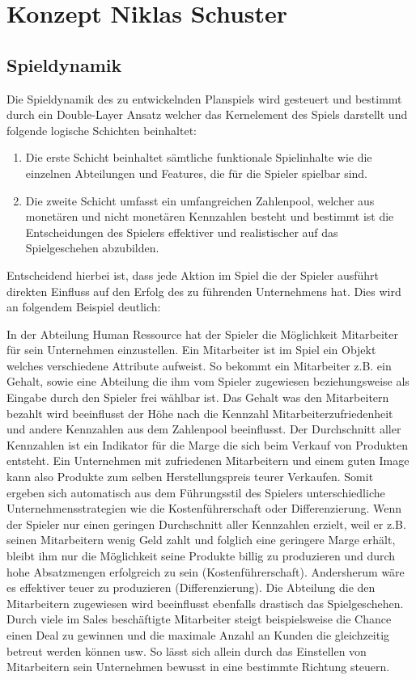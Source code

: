 \section{Konzept \textnormal{\textsf{\small{Niklas Schuster}}}}
\subsection{Spieldynamik}
Die Spieldynamik des zu entwickelnden Planspiels wird gesteuert und bestimmt durch ein Double-Layer Ansatz welcher das Kernelement des Spiels darstellt und folgende logische Schichten beinhaltet:
\begin{enumerate}
\item Die erste Schicht beinhaltet sämtliche funktionale Spielinhalte wie die einzelnen Abteilungen und Features, die für die Spieler spielbar sind.
\item Die zweite Schicht umfasst ein umfangreichen Zahlenpool, welcher aus monetären und nicht monetären Kennzahlen besteht und bestimmt ist die Entscheidungen des Spielers effektiver und realistischer auf das Spielgeschehen abzubilden.
\end{enumerate}
Entscheidend hierbei ist, dass jede Aktion im Spiel die der Spieler ausführt direkten Einfluss auf den Erfolg des zu führenden Unternehmens hat. Dies wird an folgendem Beispiel deutlich:
\par In der Abteilung Human Ressource hat der Spieler die Möglichkeit Mitarbeiter für sein Unternehmen einzustellen. Ein Mitarbeiter ist im Spiel ein Objekt welches verschiedene Attribute aufweist. So bekommt ein Mitarbeiter z.B. ein Gehalt, sowie eine Abteilung die ihm vom Spieler zugewiesen beziehungsweise als Eingabe durch den Spieler frei wählbar ist. Das Gehalt was den Mitarbeitern bezahlt wird beeinflusst der Höhe nach die Kennzahl Mitarbeiterzufriedenheit und andere Kennzahlen aus dem Zahlenpool beeinflusst. Der Durchschnitt aller Kennzahlen ist ein Indikator für die Marge die sich beim Verkauf von Produkten entsteht. Ein Unternehmen mit zufriedenen Mitarbeitern und einem guten Image kann also Produkte zum selben Herstellungspreis teurer Verkaufen. Somit ergeben sich automatisch aus dem Führungsstil des Spielers unterschiedliche Unternehmensstrategien wie die Kostenführerschaft oder Differenzierung. Wenn der Spieler nur einen geringen Durchschnitt aller Kennzahlen erzielt, weil er z.B. seinen Mitarbeitern wenig Geld zahlt und folglich eine geringere Marge erhält, bleibt ihm nur die Möglichkeit seine Produkte billig zu produzieren und durch hohe Absatzmengen erfolgreich zu sein (Kostenführerschaft). Andersherum wäre es effektiver teuer zu produzieren (Differenzierung). Die Abteilung die den Mitarbeitern zugewiesen wird beeinflusst ebenfalls drastisch das Spielgeschehen. Durch viele im Sales beschäftigte Mitarbeiter steigt beispielsweise die Chance einen Deal zu gewinnen und die maximale Anzahl an Kunden die gleichzeitig betreut werden können usw. So lässt sich allein durch das Einstellen von Mitarbeitern sein Unternehmen bewusst in eine bestimmte Richtung steuern.
